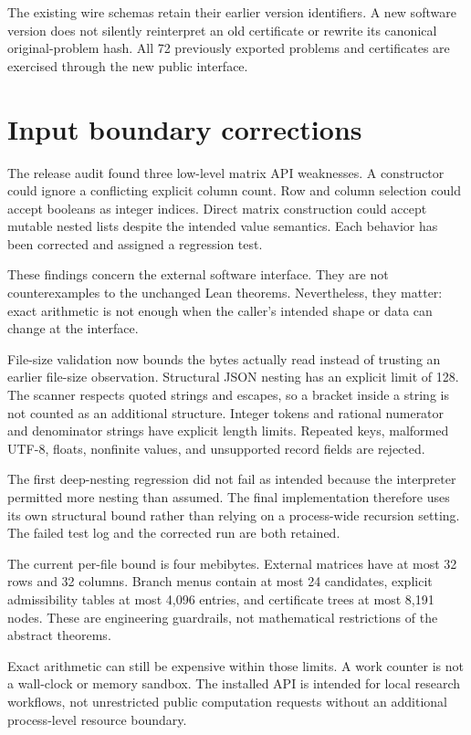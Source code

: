The existing wire schemas retain their earlier version identifiers. A new software version does not silently reinterpret an old certificate or rewrite its canonical original-problem hash. All 72 previously exported problems and certificates are exercised through the new public interface.

\section{Input boundary corrections}

The release audit found three low-level matrix API weaknesses. A constructor could ignore a conflicting explicit column count. Row and column selection could accept booleans as integer indices. Direct matrix construction could accept mutable nested lists despite the intended value semantics. Each behavior has been corrected and assigned a regression test.

These findings concern the external software interface. They are not counterexamples to the unchanged Lean theorems. Nevertheless, they matter: exact arithmetic is not enough when the caller's intended shape or data can change at the interface.

File-size validation now bounds the bytes actually read instead of trusting an earlier file-size observation. Structural JSON nesting has an explicit limit of 128. The scanner respects quoted strings and escapes, so a bracket inside a string is not counted as an additional structure. Integer tokens and rational numerator and denominator strings have explicit length limits. Repeated keys, malformed UTF-8, floats, nonfinite values, and unsupported record fields are rejected.

The first deep-nesting regression did not fail as intended because the interpreter permitted more nesting than assumed. The final implementation therefore uses its own structural bound rather than relying on a process-wide recursion setting. The failed test log and the corrected run are both retained.

The current per-file bound is four mebibytes. External matrices have at most 32 rows and 32 columns. Branch menus contain at most 24 candidates, explicit admissibility tables at most 4,096 entries, and certificate trees at most 8,191 nodes. These are engineering guardrails, not mathematical restrictions of the abstract theorems.

Exact arithmetic can still be expensive within those limits. A work counter is not a wall-clock or memory sandbox. The installed API is intended for local research workflows, not unrestricted public computation requests without an additional process-level resource boundary.

